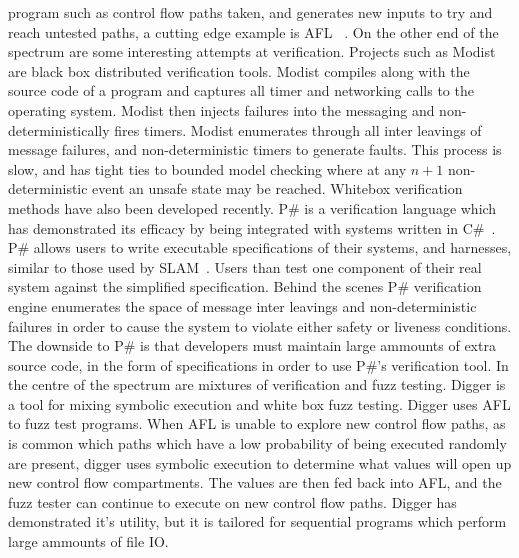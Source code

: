 program such as control flow paths taken, and generates new inputs to try and
reach untested paths, a cutting edge example is AFL ~\cite{}. On the other end
of the spectrum are some interesting attempts at verification. Projects such as
Modist ~\cite{} are black box distributed verification tools. Modist compiles
along with the source code of a program and captures all timer and networking
calls to the operating system. Modist then injects failures into the messaging
and non-deterministically fires timers. Modist enumerates through all
inter leavings of message failures, and non-deterministic timers to generate
faults. This process is slow, and has tight ties to bounded model checking
where at any $n+1$ non-deterministic event an unsafe state may be reached.
Whitebox verification methods have also been developed recently. P\# is a
verification language which has demonstrated its efficacy by being integrated
with systems written in C\#~\cite{}. P\# allows users to write executable
specifications of their systems, and harnesses, similar to those used by
SLAM~\cite{}. Users than test one component of their real system against the
simplified specification. Behind the scenes P\# verification engine
enumerates the space of message inter leavings and non-deterministic failures in
order to cause the system to violate either safety or liveness conditions. The
downside to P\# is that developers must maintain large ammounts of extra source
code, in the form of specifications in order to use P\#'s verification tool. In
the centre of the spectrum are mixtures of verification and fuzz testing.
Digger is a tool for mixing symbolic execution and white box fuzz testing.
Digger uses AFL to fuzz test programs. When AFL is unable to explore new
control flow paths, as is common which paths which have a low probability of
being executed randomly are present, digger uses symbolic execution to
determine what values will open up new control flow compartments. The values
are then fed back into AFL, and the fuzz tester can continue to execute on new
control flow paths. Digger has demonstrated it's utility, but it is tailored
for sequential programs which perform large ammounts of file IO.

